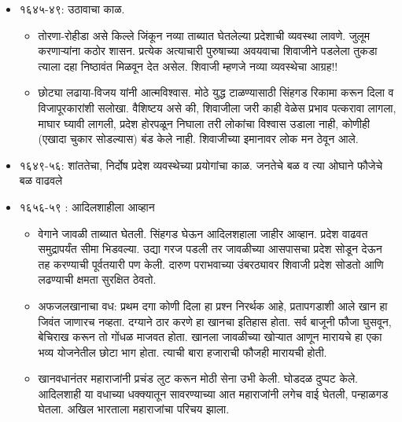 \begin{itemize}[noitemsep,nolistsep]
\item १६४५-४९: उठावाचा काळ. 
	\begin{itemize}[noitemsep,nolistsep]
	\item तोरणा-रोहीडा असे किल्ले जिंकून नव्या ताब्यात घेतलेल्या प्रदेशाची व्यवस्था लावणे. जुलूम करणाऱ्यांना कठोर शासन. प्रत्येक अत्याचारी पुरुषाच्या अवयवाचा शिवाजीने पडलेला तुकडा त्याला दहा निष्ठावंत मिळवून देत असेल. शिवाजी म्हणजे नव्या व्यवस्थेचा आग्रह!! 
	\item छोट्या लढाया-विजय यांनी आत्मविश्वास. मोठे युद्ध टाळण्यासाठी सिंहगड रिकामा करून दिला व विजापूरकारांशी सलोखा. वैशिष्टय असे की, शिवाजीला जरी काही वेळेस प्रभाव पत्करावा लागला, माघार घ्यावी लागली, प्रदेश होरपळून निघाला तरी लोकांचा विश्वास उडाला नाही, कोणीही (एखादा चुकार सोडल्यास) बंड केले नाही. शिवाजीच्या इमानावर लोक मन ठेवून आले.
	\end{itemize}

\item १६४९-५६: शांततेचा, निर्दोष प्रदेश व्यवस्थेच्या प्रयोगांचा काळ. जनतेचे बळ व त्या ओघाने फौजेचे बळ वाढवले
\item १६५६-५९  : आदिलशाहीला आव्हान
	\begin{itemize}[noitemsep,nolistsep]
	\item वेगाने जावळी ताब्यात घेतली. सिंहगड घेऊन आदिलशहाला जाहीर आव्हान. प्रदेश वाढवत समुद्रापर्यंत सीमा भिडवल्या. उद्या गरज पडली तर जावळीच्या आसपासचा प्रदेश सोडून देऊन तह करण्याची पूर्वतयारी पण केली. दारुण पराभवाच्या उंबरठ्यावर शिवाजी प्रदेश सोडतो आणि लढण्याची क्षमता सुरक्षित ठेवतो.
	\item अफजलखानाचा वध: प्रथम दगा कोणी दिला हा प्रश्न निरर्थक आहे, प्रतापगडाशी आले खान हा जिवंत जाणारच नव्हता. दग्याने ठार करणे हा खानचा इतिहास होता. सर्व बाजूनी फौजा घुसवून, बेचिराख करून तो गोंधळ माजवत होता. खानला जावळीच्या खोऱ्यात आणून मारायचे हा एका भव्य योजनेतील छोटा भाग होता. त्याची बारा हजाराची फौजही मारायची होती.
	\item खानवधानंतर महाराजांनी प्रचंड लुट करून मोठी सेना उभी केली. घोडदळ दुप्पट केले. आदिलशाही या वधाच्या धक्क्यातून सावरण्याच्या आत महाराजांनी लगेच वाई घेतली, पन्हाळगड घेतला. अखिल भारताला महाराजांचा परिचय झाला.
	\end{itemize}


\end{itemize}

